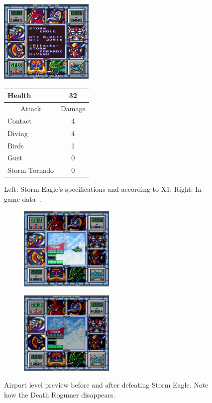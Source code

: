 \begin{figure}[htp]
	\begin{minipage}[c]{0.45\linewidth}
		\vspace{0pt}
		\centering
		\includegraphics[height=4cm]{figures/X1/Storm_eagle/Storm_eagle_specs.png}
	\end{minipage}
	\begin{minipage}[c]{0.45\linewidth}
		\centering
		\vspace{0pt}
		\begin{tabular}[h]{l c}
			\toprule
			Health  & 32\\
			\midrule
			\multicolumn{1}{c}{Attack} & \multicolumn{1}{c}{Damage}\\
			Contact & 4\\
			Diving & 4\\
			Birds & 1\\
			Gust & 0\\
			Storm Tornado & 0\\
			\bottomrule
		\end{tabular}
	\end{minipage}
	\caption{Left: Storm Eagle's specifications and according to X1; Right: In-game data~\cite{wiki:Storm_eagle}. }
	\label{Eagle_specs}
\end{figure}

\begin{figure}[htp]
	\centering
	\begin{subfigure}{0.4\linewidth}
		\centering
		\includegraphics[height=4cm]{figures/X1/Storm_eagle/Storm_prev_1.jpg}
		\caption{}
	\end{subfigure}
	\begin{subfigure}{0.4\linewidth}
		\centering
		\includegraphics[height=4cm]{figures/X1/Storm_eagle/Storm_prev_2.jpg}
		\caption{}
	\end{subfigure}
	\caption{Airport level preview before and after defeating Storm Eagle. Note how the Death Rogumer disappears.}
\end{figure}


